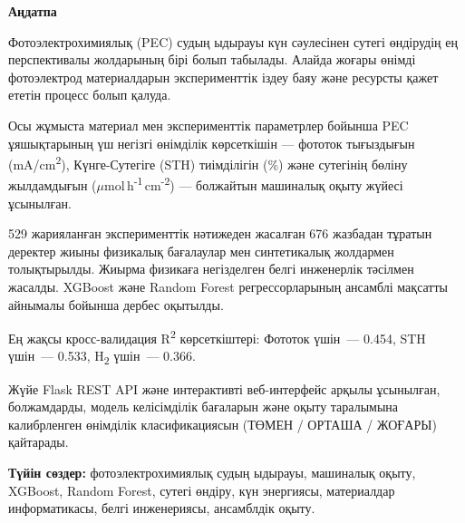 \newpage
\pagestyle{plain}

{
\begin{center}
    \Large
    \textbf{Аңдатпа}
\end{center}

\vspace{0.5cm}

Фотоэлектрохимиялық (PEC) судың ыдырауы күн сәулесінен сутегі өндірудің ең перспективалы
жолдарының бірі болып табылады. Алайда жоғары өнімді фотоэлектрод материалдарын
эксперименттік іздеу баяу және ресурсты қажет ететін процесс болып қалуда.

Осы жұмыста материал мен эксперименттік параметрлер бойынша PEC ұяшықтарының үш
негізгі өнімділік көрсеткішін --- фототок тығыздығын (mA/cm\textsuperscript{2}),
Күнге-Сутегіге (STH) тиімділігін (\%) және сутегінің бөліну жылдамдығын
($\mu$mol\,h\textsuperscript{-1}\,cm\textsuperscript{-2}) --- болжайтын
машиналық оқыту жүйесі ұсынылған.

529 жарияланған эксперименттік нәтижеден жасалған 676 жазбадан тұратын деректер жиыны
физикалық бағалаулар мен синтетикалық жолдармен толықтырылды.
Жиырма физикаға негізделген белгі инженерлік тәсілмен жасалды.
XGBoost және Random Forest регрессорларының ансамблі мақсатты айнымалы бойынша
дербес оқытылды.

Ең жақсы кросс-валидация R\textsuperscript{2} көрсеткіштері:
Фототок үшін~--- 0.454,
STH үшін~--- 0.533,
H\textsubscript{2} үшін~--- 0.366.

Жүйе Flask REST API және интерактивті веб-интерфейс арқылы ұсынылған,
болжамдарды, модель келісімділік бағаларын және оқыту таралымына
калибрленген өнімділік класификациясын (ТӨМЕН / ОРТАША / ЖОҒАРЫ)
қайтарады.

\vspace{0.5cm}
\noindent\textbf{Түйін сөздер:} фотоэлектрохимиялық судың ыдырауы,
машиналық оқыту, XGBoost, Random Forest, сутегі өндіру, күн энергиясы,
материалдар информатикасы, белгі инженериясы, ансамблдік оқыту.
}
